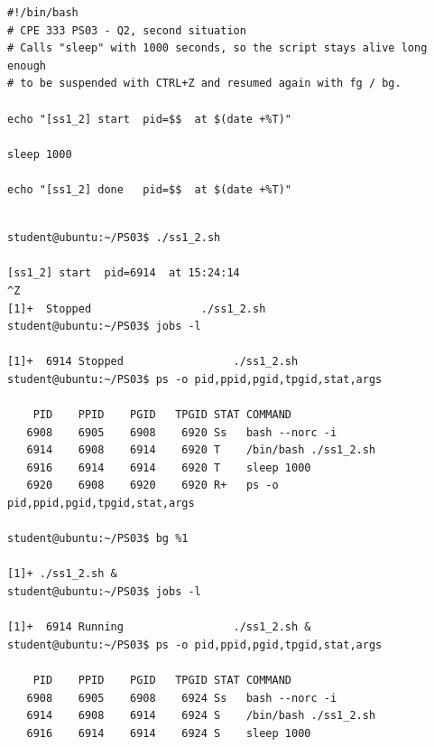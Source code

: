 \documentclass[a4paper,11pt]{article}
\newcommand{\code}[1]{\texttt{#1}}
\begin{document}
\begin{lstlisting}[style=bashstyle,caption={ss1\_2.sh},label={lst:ss1_2}]
#!/bin/bash
# CPE 333 PS03 - Q2, second situation
# Calls "sleep" with 1000 seconds, so the script stays alive long enough
# to be suspended with CTRL+Z and resumed again with fg / bg.

echo "[ss1_2] start  pid=$$  at $(date +%T)"

sleep 1000

echo "[ss1_2] done   pid=$$  at $(date +%T)"
\end{lstlisting}

\begin{lstlisting}[style=terminal,caption={CTRL+Z ทำให้ทั้ง process group หยุด (สถานะ T) แล้ว \code{bg} ปลุกกลับมาทำงานเบื้องหลัง}]

student@ubuntu:~/PS03$ ./ss1_2.sh

[ss1_2] start  pid=6914  at 15:24:14
^Z
[1]+  Stopped                 ./ss1_2.sh
student@ubuntu:~/PS03$ jobs -l

[1]+  6914 Stopped                 ./ss1_2.sh
student@ubuntu:~/PS03$ ps -o pid,ppid,pgid,tpgid,stat,args

    PID    PPID    PGID   TPGID STAT COMMAND
   6908    6905    6908    6920 Ss   bash --norc -i
   6914    6908    6914    6920 T    /bin/bash ./ss1_2.sh
   6916    6914    6914    6920 T    sleep 1000
   6920    6908    6920    6920 R+   ps -o pid,ppid,pgid,tpgid,stat,args

student@ubuntu:~/PS03$ bg %1

[1]+ ./ss1_2.sh &
student@ubuntu:~/PS03$ jobs -l

[1]+  6914 Running                 ./ss1_2.sh &
student@ubuntu:~/PS03$ ps -o pid,ppid,pgid,tpgid,stat,args

    PID    PPID    PGID   TPGID STAT COMMAND
   6908    6905    6908    6924 Ss   bash --norc -i
   6914    6908    6914    6924 S    /bin/bash ./ss1_2.sh
   6916    6914    6914    6924 S    sleep 1000
\end{lstlisting}
\end{document}
